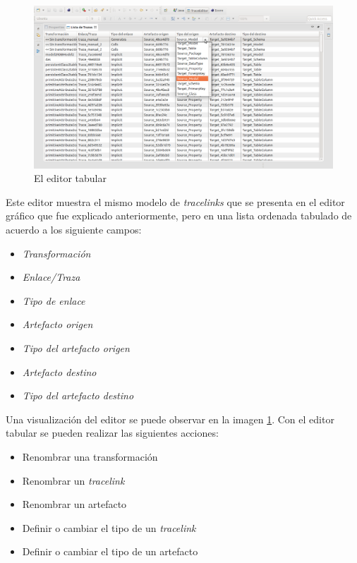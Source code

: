 \documentclass[a4paper,12pt,oneside,spanish]{book}
\begin{document}
\begin{figure}[hbtp]
\centering
\includegraphics[scale=.29]{./img/TraceEditorTabular}
\caption{El editor tabular}
\label{fig:TraceEditorTabular}
\end{figure}

Este editor muestra el mismo modelo de \textit{tracelinks} que se presenta en el editor gráfico que fue explicado anteriormente, pero en una lista ordenada tabulado de acuerdo a los siguiente campos:

\begin{itemize}
\item \textsf{\textit{Transformación}}
\item \textsf{\textit{Enlace/Traza}}
\item \textsf{\textit{Tipo de enlace}}
\item \textsf{\textit{Artefacto origen}}
\item \textsf{\textit{Tipo del artefacto origen}}
\item \textsf{\textit{Artefacto destino}}
\item \textsf{\textit{Tipo del artefacto destino}}
\end{itemize}


Una visualización del editor se puede observar en la imagen \ref{fig:TraceEditorTabular}. Con el editor tabular se pueden realizar las siguientes acciones:

\begin{itemize}
\item Renombrar una transformación
\item Renombrar un \textit{tracelink}
\item Renombrar un artefacto
\item Definir o cambiar el tipo de un \textit{tracelink}
\item Definir o cambiar el tipo de un artefacto
\end{itemize}
\end{document}
